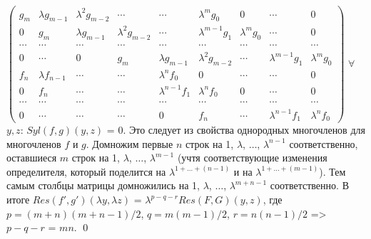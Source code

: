 \documentclass[a4paper, 12pt]{article}
\begin{document}
$\begin{pmatrix}
g_m & \lambda g_{m-1} & \lambda^{2} g_{m-2} & \cdots & \cdots & \lambda^{m}g_0 & 0 & \cdots & 0 \\
0 & g_m & \lambda g_{m-1} & \lambda^{2} g_{m-2} & \cdots & \lambda^{m-1} g_1 & \lambda^{m} g_0 & \cdots & 0 \\
\cdots & \cdots & \cdots & \cdots & \cdots & \cdots & \cdots & \cdots & \cdots \\
0 & \cdots & 0 & g_m & \lambda g_{m-1} & \lambda^{2} g_{m-2} & \cdots & \lambda^{m-1} g_1 & \lambda^{m} g_0 \\
f_n & \lambda f_{n-1} & \cdots & \cdots & \lambda^{n} f_0 & 0 & \cdots & \cdots & 0 \\
0 & f_n & \cdots & \cdots & \lambda^{n-1} f_1 & \lambda^{n} f_0 & 0 & \cdots & 0 \\
\cdots & \cdots & \cdots & \cdots & \cdots & \cdots & \cdots & \cdots & \cdots \\
0 & \cdots & \cdots & \cdots & 0 & f_n & \cdots & \lambda^{n-1} f_1 & \lambda^{n} f_0
\end{pmatrix}$\newline
$\forall$ $y,z$: $Syl(f,g)(y,z)$ = $0$. Это следует из свойства однородных многочленов для многочленов $f$ и $g$.
\newline
Домножим первые $n$ строк на 1, $\lambda$, $\dots$, $\lambda^{n-1}$ соответственно, оставшиеся $m$ строк на 1, $\lambda$, $\dots$, $\lambda^{m-1}$ (учтя соответствующие изменения определителя, который поделится на $\lambda^{1 +\dots + (n-1)}$ и на $\lambda^{1 +\dots + (m-1)}$).
Тем самым столбцы матрицы домножились на 1, $\lambda$, $\dots$, $\lambda^{m + n - 1}$ соответственно.\newline
В итоге $Res(f',g')(\lambda y,\lambda z)$ = $\lambda^{p-q-r}Res(F,G)(y,z)$, где $p = (m+n)(m+n-1)/2$, $q = m(m-1)/2 $, $r = n(n-1)/2$ => $p-q-r$ = $mn$.
\qed

\end{document}

